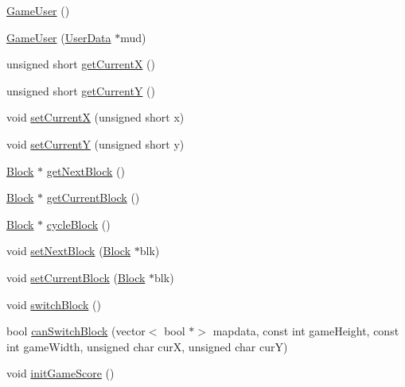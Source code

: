 \begin{DoxyCompactItemize}
\item 
\hyperlink{class_tetris_1_1_users_1_1_game_user_af9d7bed8e019ca4348995337ea7339b7}{Game\+User} ()
\item 
\hyperlink{class_tetris_1_1_users_1_1_game_user_a61819671f799d3d6cb2d89e99ffd1714}{Game\+User} (\hyperlink{class_tetris_1_1_users_1_1_user_data}{User\+Data} $\ast$mud)
\item 
unsigned short \hyperlink{class_tetris_1_1_users_1_1_game_user_ad25eace96bd27ae6df4a0c0d506be730}{get\+CurrentX} ()
\item 
unsigned short \hyperlink{class_tetris_1_1_users_1_1_game_user_af5bd7ff0b575af1b42b093488cff97e2}{get\+CurrentY} ()
\item 
void \hyperlink{class_tetris_1_1_users_1_1_game_user_a2957358b1a6298f06c6c2e10cb89f623}{set\+CurrentX} (unsigned short x)
\item 
void \hyperlink{class_tetris_1_1_users_1_1_game_user_aeedbe521004c22018b73a509e99f7d81}{set\+CurrentY} (unsigned short y)
\item 
\hyperlink{class_tetris_1_1_block}{Block} $\ast$ \hyperlink{class_tetris_1_1_users_1_1_game_user_a9fdd8809e412f1d9a665c0cfb15af48d}{get\+Next\+Block} ()
\item 
\hyperlink{class_tetris_1_1_block}{Block} $\ast$ \hyperlink{class_tetris_1_1_users_1_1_game_user_a83ae79738da7c0b42fc5e4f4c7016318}{get\+Current\+Block} ()
\item 
\hyperlink{class_tetris_1_1_block}{Block} $\ast$ \hyperlink{class_tetris_1_1_users_1_1_game_user_a6011fe9738235fa93fac51db4fafdbd7}{cycle\+Block} ()
\item 
void \hyperlink{class_tetris_1_1_users_1_1_game_user_a6249d0f4e9d77edd94935a74bbd298d5}{set\+Next\+Block} (\hyperlink{class_tetris_1_1_block}{Block} $\ast$blk)
\item 
void \hyperlink{class_tetris_1_1_users_1_1_game_user_ae1743f8024d25ed74d7b2e456907ee41}{set\+Current\+Block} (\hyperlink{class_tetris_1_1_block}{Block} $\ast$blk)
\item 
void \hyperlink{class_tetris_1_1_users_1_1_game_user_a1d1efa857420c82248fd12da9c08ef77}{switch\+Block} ()
\item 
bool \hyperlink{class_tetris_1_1_users_1_1_game_user_a1962ed051506010440645f7f3b50760d}{can\+Switch\+Block} (vector$<$ bool $\ast$$>$ mapdata, const int game\+Height, const int game\+Width, unsigned char curX, unsigned char curY)
\item 
void \hyperlink{class_tetris_1_1_users_1_1_game_user_a746fd00bc5c7efda0cc28fe7bbb855ac}{init\+Game\+Score} ()
$$
\end{DoxyCompactItemize}
